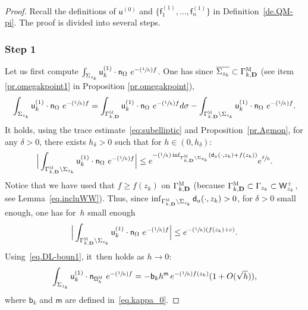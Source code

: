 \documentclass[JEP,XML,SOM,Unicode,NoEqCountersInSection,NoFloatCountersInSection,published]{cedram}
\newcommand{\Psfrac}[2]{(\sfrac{#1}{#2})}
\newcommand{\mbf}[1]{\mathbf{#1}}
\theoremstyle{plain}
\theoremstyle{definition}
\begin{document}
\begin{proof} Recall the definitions of $\mathsf u^{(0)}$
and $\{\mathsf f_1^{(1)}, \ldots, \mathsf f_n^{(1)}\} $ in Definition~\ref{de.QM-pi}.
The proof is divided into several steps.

\subsubsection*{Step 1} Let us first compute $ \int_{\Sigma_{z_k}} \mathsf u_k^{(1)} \cdot \mathsf n_\Omega \ e^{- \Psfrac{1}{h} f} $. One has since $\overline{\Sigma_{z_k}} \subset \Gamma_{k,\mbf D}^{ \textsc{M} }$ (see item \eqref{pr.omegakpoint1} in Proposition \ref{pr.omegakpoint}),
\begin{align*}
\int_{\Sigma_{z_k}} \mathsf u_k^{(1)} \cdot \mathsf n_\Omega \ e^{- \Psfrac{1}{h} f} = \int_{\Gamma_{k,\mbf D}^{ \textsc{M} } } \mathsf u_k^{(1)} \cdot \mathsf n_\Omega \ e^{- \Psfrac{1}{h} f} d\sigma - \int_{\Gamma_{k,\mbf D}^{ \textsc{M} } \setminus \Sigma_{z_k} } \mathsf u_k^{(1)} \cdot \mathsf n_\Omega \ e^{- \Psfrac{1}{h} f}.
\end{align*}
It holds, using the trace estimate~\eqref{eq:subelliptic} and Proposition~\ref{pr.Agmon}, for any $\delta>0$, there exists $h_\delta>0$ such that for $h\in (0,h_\delta)$:
\[
\Big \vert \int_{\Gamma_{k,\mbf D}^{ \textsc{M} } \setminus \Sigma_{z_k} } \mathsf u_k^{(1)} \cdot \mathsf n_\Omega \ e^{- \Psfrac{1}{h} f} \Big \vert \le e^{-\Psfrac 1h \inf_{\Gamma_{k,\mbf D}^{ \textsc{M} } \setminus \Sigma_{z_k}}(\mathsf d_a(\cdot, z_k)+f(z_k))} e^{\sfrac{ \delta }{h}}.
\]
Notice that we have used that $f\ge f(z_k)$ on $\Gamma_{k,\mbf D}^{ \textsc{M} }$ (because $\Gamma_{k,\mbf D}^{ \textsc{M} }\subset \Gamma_{z_k} \subset \mathsf W_{z_k}^+$, see Lemma~\ref{eq.incluWW}).
Thus, since $\inf_{\Gamma_{k,\mbf D}^{ \textsc{M} } \setminus \Sigma_{z_k}}\mathsf d_a(\cdot, z_k)>0$, for $\delta>0$ small enough, one has for~$h$ small enough
\begin{align}\label{eq.ici2}
\Big \vert \int_{\Gamma_{k,\mbf D}^{ \textsc{M} } \setminus \Sigma_{z_k} } \mathsf u_k^{(1)} \cdot \mathsf n_\Omega \ e^{- \Psfrac{1}{h} f} \Big \vert \le e^{-\Psfrac 1h (f(z_k)+c)}.
\end{align}
Using~\eqref{eq.DL-boun1}, it~then holds as $h\to 0$:
\begin{align*}
\int_{\Sigma_{z_k}}\mathsf u^{(1)}_k \cdot \mathsf n_{ \mathsf \Omega_k^{\textsc{M}} }\ e^{-\Psfrac 1hf}=-\mathsf b_k h^{\mathsf m} \, e^{-\Psfrac 1h f(z_k)} (1+O(\sqrt h)),
\end{align*}
where $\mathsf b_k$ and $\mathsf m$ are defined in~\eqref{eq.kappa_0}.


\end{proof}
\end{document}

